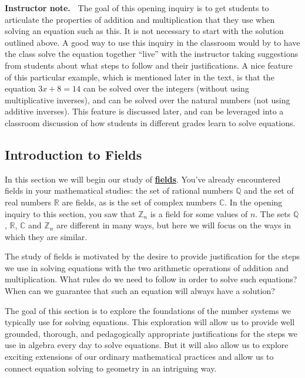 \documentclass[11pt]{article}
\newenvironment{bignote}[1][Instructor note]%
	{\begin{mdframed}\raggedright{\bf #1.~}}
	{\end{mdframed}}
\renewcommand\emph[1]{\underline{\bf{#1}}} %
\theoremstyle{definition}
\begin{document}
\begin{bignote}
The goal of this opening inquiry is to get students to articulate the properties of addition and multiplication that they use when solving an equation such as this. It is not necessary to start with the
solution outlined above. A good way to use this inquiry in the classroom would by to have the class solve the equation together ``live'' with the instructor taking suggestions from students about what steps
to follow and their justifications. A nice feature of this particular example, which is mentioned later in the text, is that the equation $3x+8=14$ can be solved over the integers (without using multiplicative
inverses), and can be solved over the natural numbers (not using additive inverses). This feature is discussed later, and can be leveraged into a classroom discussion of how students in different grades learn
to solve equations.
\end{bignote}


\subsection{Introduction to Fields}

In this section we will begin our study of \emph{fields}. You've already encountered fields in your mathematical studies: the set of rational numbers $\mathbb{Q}$ 
and the set of real numbers $\mathbb{R}$ are fields, as is the set of complex numbers $\mathbb{C}$. In the opening inquiry to this section, you saw that
$\mathbb{Z}_n$ is a field for some values of $n$. The sets $\mathbb{Q}$, $\mathbb{R}$, $\mathbb{C}$ and $\mathbb{Z}_n$ are 
different in many ways, but here we will focus on the ways in which they are similar. 

The study of fields is motivated by the desire to provide justification for the steps we use in solving equations with the two arithmetic operations of
addition and multiplication. What rules do we need to follow in order to solve such equations? When can we guarantee that such an equation will always 
have a solution?

The goal of this section is to explore the foundations of the number systems we typically use for solving equations. This exploration will allow us to provide 
well grounded, thorough, and pedagogically appropriate justifications for the steps we use in algebra every day to solve equations. But it will also allow 
us to explore exciting extensions of our ordinary mathematical practices and allow us to connect equation solving to geometry in an intriguing way.
\end{document}
